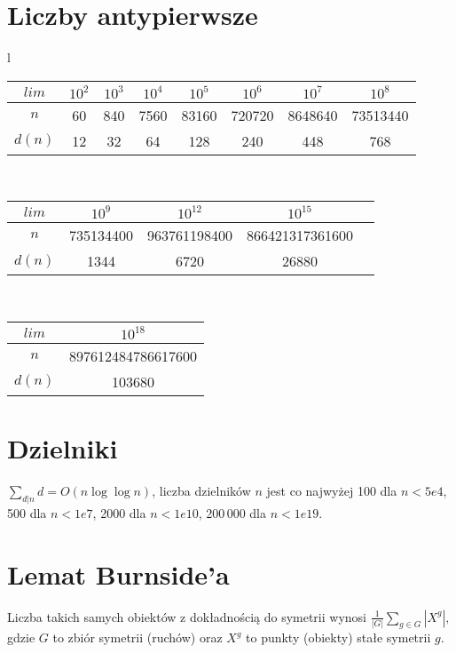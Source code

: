 \section{Liczby antypierwsze}
		\begin{center}
			\begin{tabular}{l}
				\begin{tabular}{c|c@{\ }c@{\ }c@{\ }c@{\ }c@{\ }c@{\ }c@{\ }}
					$lim$  & $10^2$ & $10^3$ & $10^4$ & $10^5$ & $10^6$ & $10^7$ & $10^8$ \\
					\hline
					$n$ & 60 & 840 & 7560 & 83160 & 720720 & 8648640 & 73513440 \\
					\hline
					$d(n)$ & 12 & 32 & 64 & 128 & 240 & 448 & 768 \\
				\end{tabular}\\
				\begin{tabular}{c|c@{\ }c@{\ }c@{\ }c}
					$lim$  & $10^9$ & $10^{12}$  & $10^{15}$ \\
					\hline
					$n$ & 735134400 & 963761198400 & 866421317361600 \\
					\hline
					$d(n)$ & 1344 & 6720 & 26880 \\
				\end{tabular}\\
				\begin{tabular}{c|c@{\ }}
					$lim$  & $10^{18}$\\
					\hline
					$n$ & 897612484786617600\\
					\hline
					$d(n)$ & 103680\\
				\end{tabular}
			\end{tabular}
		\end{center}

\section{Dzielniki}
	$\sum_{d|n} d = O(n \log \log n)$,
	liczba dzielników $n$ jest co najwyżej 100 dla $n < 5e4$, 500 dla $n < 1e7$, 2000 dla $n < 1e10$, 200\,000 dla $n < 1e19$.


\section{Lemat Burnside'a}
	Liczba takich samych obiektów z dokładnością do symetrii wynosi
	$ {\frac {1}{|G|}}\sum _{{g\in G}}|X^{g}|, $
	gdzie $G$ to zbiór symetrii (ruchów) oraz $X^g$ to punkty (obiekty) stałe symetrii $g$.

